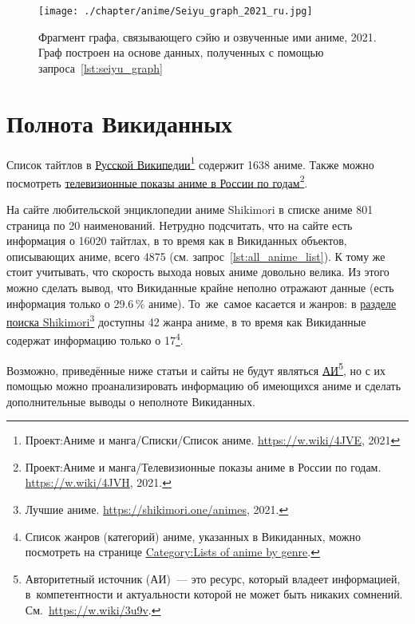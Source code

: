 \newpage
\begin{figure*}[h!]
	\texttt{[image: ./chapter/anime/Seiyu\_graph\_2021\_ru.jpg]}\centering
	\caption[Граф сэйю и аниме, 2021 год.]{Фрагмент графа, связывающего сэйю и озвученные ими аниме, 2021. Граф построен на основе данных, полученных с помощью запроса~\protect\ref{lst:seiyu_graph}}%
      \label{fig:Seiyu_graph_2021_ru}%
\end{figure*} 




\section{Полнота Викиданных}

Список тайтлов в \href{https://w.wiki/4JVE}{Русской Википедии}\footnote{Проект:Аниме и манга/Списки/Список аниме. \href{https://w.wiki/4JVE}{https://w.wiki/4JVE}, 2021} содержит \num{1638} аниме. Также можно посмотреть \href{https://w.wiki/4JVH}{телевизионные показы аниме в России по годам}\footnote{Проект:Аниме и манга/Телевизионные показы аниме в России по годам. \href{https://w.wiki/4JVH}{https://w.wiki/4JVH}, 2021.}.

На сайте любительской энциклопедии аниме Shikimori\autocite{shikimori} 
в списке аниме \num{801} страница по 20 наименований. 
Нетрудно подсчитать, что на сайте есть информация о \num{16020} тайтлах, 
в то время как в Викиданных объектов, описывающих аниме, всего \num{4875} 
(см. запрос~\ref{lst:all_anime_list}). 
К тому же стоит учитывать, что скорость выхода новых аниме довольно велика. 
Из этого можно сделать вывод, что Викиданные крайне неполно отражают данные 
(есть информация только о \num{29.6}\,\% аниме). То~же~самое касается и жанров: 
в \href{https://shikimori.one/animes}{разделе поиска Shikimori}\footnote{%
%
    Лучшие аниме. \href{https://shikimori.one/animes}{https://shikimori.one/animes}, 2021.%
%
} доступны 42 жанра аниме, 
в то время как Викиданные содержат информацию только о 17\footnote{%
%
    Список жанров (категорий) аниме, указанных в Викиданных, 
    можно посмотреть на странице 
    \href{https://en.wikipedia.org/wiki/Category:Lists\_of_anime\_by\_genre}{Category:Lists of anime by genre}.%
}.

Возможно, приведённые ниже статьи и сайты не будут являться \href{https://w.wiki/3u9v}{АИ}\footnote{%
    Авторитетный источник (АИ)~--- это ресурс, который владеет информацией, 
    в~компетентности и актуальности которой не может быть никаких сомнений. 
    См.~\href{https://w.wiki/3u9v}{https://w.wiki/3u9v}.%
%
}, но с их помощью можно проанализировать информацию об имеющихся аниме и сделать дополнительные выводы о неполноте Викиданных.



